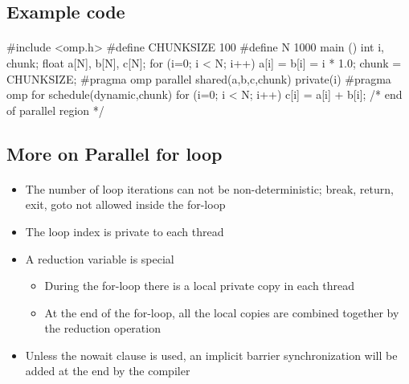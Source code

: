 \documentclass[%
twoside,                 %
final,                   %
10pt]{article}
\begin{document}
{%
\subsection{Example code}

\paragraph{}
\bcppcod
#include <omp.h>
#define CHUNKSIZE 100
#define N
1000
main ()
{
int i, chunk;
float a[N], b[N], c[N];
for (i=0; i < N; i++)
a[i] = b[i] = i * 1.0;
chunk = CHUNKSIZE;
#pragma omp parallel shared(a,b,c,chunk) private(i)
{
#pragma omp for schedule(dynamic,chunk)
for (i=0; i < N; i++)
c[i] = a[i] + b[i];
} /* end of parallel region */
}
\ecppcod



\subsection{More on Parallel for loop}

\paragraph{}
\begin{itemize}
\item The number of loop iterations can not be non-deterministic; break, return, exit, goto not allowed inside the for-loop

\item The loop index is private to each thread

\item A reduction variable is special
\begin{itemize}

  \item During the for-loop there is a local private copy in each thread

  \item At the end of the for-loop, all the local copies are combined together by the reduction operation

\end{itemize}

\noindent
\item Unless the nowait clause is used, an implicit barrier synchronization will be added at the end by the compiler
\end{itemize}

}
\end{document}
